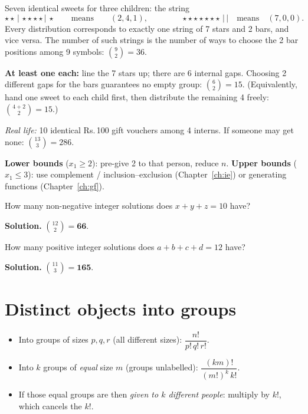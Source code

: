 \documentclass[11pt,a4paper,openany]{report}
\newcommand{\C}[2]{\binom{#1}{#2}}
\newcommand{\Rs}{Rs.\,}
\begin{document}
\begin{why}
Seven identical sweets for three children: the string
\[\star\star\,|\,\star\star\star\star\,|\,\star \qquad\text{means}\qquad (2,4,1),\qquad\qquad
\star\star\star\star\star\star\star\,|\,| \quad\text{means}\quad (7,0,0).\]
Every distribution corresponds to exactly one string of 7 stars and 2 bars, and vice versa. The number of
such strings is the number of ways to choose the 2 bar positions among 9 symbols: $\C92=36$.

\textbf{At least one each:} line the 7 stars up; there are 6 internal gaps. Choosing 2 different gaps for the
bars guarantees no empty group: $\C62=15$. (Equivalently, hand one sweet to each child first, then
distribute the remaining 4 freely: $\C{4+2}{2}=15$.)
\end{why}

\textit{Real life:} 10 identical \Rs100 gift vouchers among 4 interns. If someone may get none:
$\C{13}{3}=286$.

\textbf{Lower bounds} ($x_1\ge2$): pre-give 2 to that person, reduce $n$. \textbf{Upper bounds}
($x_1\le3$): use complement / inclusion--exclusion (Chapter~\ref{ch:ie}) or generating functions (Chapter~\ref{ch:gf}).

\begin{example}
How many non-negative integer solutions does $x+y+z=10$ have?

\textbf{Solution.} $\C{12}{2}=\mathbf{66}$.
\end{example}

\begin{example}
How many positive integer solutions does $a+b+c+d=12$ have?

\textbf{Solution.} $\C{11}{3}=\mathbf{165}$.
\end{example}

\section{Distinct objects into groups}
\begin{itemize}
\item Into groups of sizes $p, q, r$ (all different sizes): $\dfrac{n!}{p!\,q!\,r!}$.
\item Into $k$ groups of \emph{equal} size $m$ (groups unlabelled): $\dfrac{(km)!}{(m!)^k\,k!}$.
\item If those equal groups are then \emph{given to $k$ different people}: multiply by $k!$, which cancels the $k!$.
\end{itemize}
\end{document}
